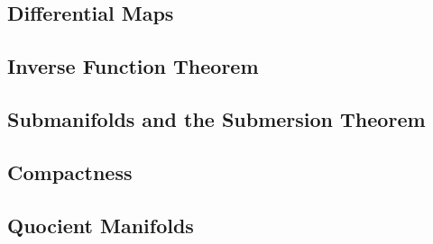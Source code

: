 \subsection{Differential Maps}

\subsection{Inverse Function Theorem}

\subsection{Submanifolds and the Submersion Theorem}

\subsection{Compactness}

\subsection{Quocient Manifolds}




\cleardoublepage